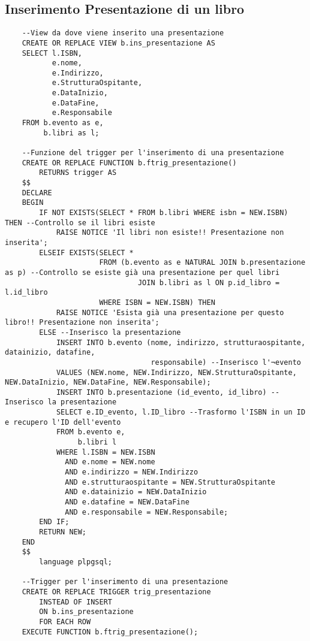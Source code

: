 \subsection{Inserimento Presentazione di un libro}
\begin{lstlisting}
    --View da dove viene inserito una presentazione
    CREATE OR REPLACE VIEW b.ins_presentazione AS
    SELECT l.ISBN,
           e.nome,
           e.Indirizzo,
           e.StrutturaOspitante,
           e.DataInizio,
           e.DataFine,
           e.Responsabile
    FROM b.evento as e,
         b.libri as l;
    
    --Funzione del trigger per l'inserimento di una presentazione
    CREATE OR REPLACE FUNCTION b.ftrig_presentazione()
        RETURNS trigger AS
    $$
    DECLARE
    BEGIN
        IF NOT EXISTS(SELECT * FROM b.libri WHERE isbn = NEW.ISBN) THEN --Controllo se il libri esiste
            RAISE NOTICE 'Il libri non esiste!! Presentazione non inserita';
        ELSEIF EXISTS(SELECT *
                      FROM (b.evento as e NATURAL JOIN b.presentazione as p) --Controllo se esiste già una presentazione per quel libri
                               JOIN b.libri as l ON p.id_libro = l.id_libro
                      WHERE ISBN = NEW.ISBN) THEN
            RAISE NOTICE 'Esista già una presentazione per questo libro!! Presentazione non inserita';
        ELSE --Inserisco la presentazione
            INSERT INTO b.evento (nome, indirizzo, strutturaospitante, datainizio, datafine,
                                  responsabile) --Inserisco l'¬evento
            VALUES (NEW.nome, NEW.Indirizzo, NEW.StrutturaOspitante, NEW.DataInizio, NEW.DataFine, NEW.Responsabile);
            INSERT INTO b.presentazione (id_evento, id_libro) --Inserisco la presentazione
            SELECT e.ID_evento, l.ID_libro --Trasformo l'ISBN in un ID e recupero l'ID dell'evento
            FROM b.evento e,
                 b.libri l
            WHERE l.ISBN = NEW.ISBN
              AND e.nome = NEW.nome
              AND e.indirizzo = NEW.Indirizzo
              AND e.strutturaospitante = NEW.StrutturaOspitante
              AND e.datainizio = NEW.DataInizio
              AND e.datafine = NEW.DataFine
              AND e.responsabile = NEW.Responsabile;
        END IF;
        RETURN NEW;
    END
    $$
        language plpgsql;
    
    --Trigger per l'inserimento di una presentazione
    CREATE OR REPLACE TRIGGER trig_presentazione
        INSTEAD OF INSERT
        ON b.ins_presentazione
        FOR EACH ROW
    EXECUTE FUNCTION b.ftrig_presentazione();
\end{lstlisting}

